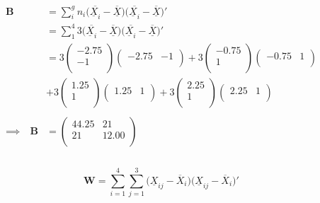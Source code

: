\documentclass[11pt,a4paper]{article}
\theoremstyle{definition}
\begin{document}
\begin{align*}
\textbf{B} & = \sum^g_in_i\big(\overline{\underline{X}_i}-\overline{\underline{X}}\big)\big(\overline{\underline{X}_i}-\overline{\underline{X}}\big)'\\
& = \sum^4_1 3\big(\overline{\underline{X}_i}-\overline{\underline{X}}\big)\big(\overline{\underline{X}_i}-\overline{\underline{X}}\big)'\\
& = 3\begin{pmatrix}
-2.75\\ -1\\
\end{pmatrix}
\begin{pmatrix}
-2.75 & -1\\
\end{pmatrix} + 3\begin{pmatrix}
-0.75\\ 1\\
\end{pmatrix}
\begin{pmatrix}
-0.75 & 1\\
\end{pmatrix}\\
&
 + 3 \begin{pmatrix}
1.25\\1\\
\end{pmatrix}
\begin{pmatrix}
1.25 & 1\\
\end{pmatrix}
+ 3\begin{pmatrix}
2.25\\ 1\\
\end{pmatrix}
\begin{pmatrix}
2.25 & 1\\
\end{pmatrix}\\\\
\implies \quad  \textbf{B}& = \begin{pmatrix}
44.25 & 21\\
21 & 12.00\\
\end{pmatrix}\\\\
\end{align*}




$$ \textbf{W}= \sum^4_{i=1}\sum^3_{j=1}\big(\underline{X}_{ij}-\overline{X}_i\big)\big(\underline{X}_{ij}-\overline{X}_i\big)'$$
\end{document}
